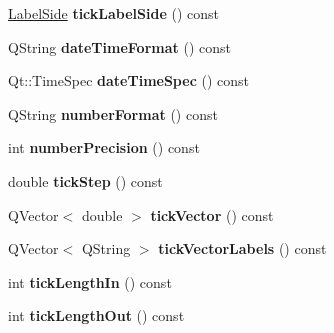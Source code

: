 \begin{DoxyCompactItemize}
\item 
\hyperlink{class_q_c_p_axis_a24b13374b9b8f75f47eed2ea78c37db9}{Label\+Side} {\bfseries tick\+Label\+Side} () const \hypertarget{class_q_c_p_axis_a0a33835705406506b02a445b1ba32357}{}\label{class_q_c_p_axis_a0a33835705406506b02a445b1ba32357}

\item 
Q\+String {\bfseries date\+Time\+Format} () const \hypertarget{class_q_c_p_axis_a132b54ae184a12ed24c9af24f53dc70b}{}\label{class_q_c_p_axis_a132b54ae184a12ed24c9af24f53dc70b}

\item 
Qt\+::\+Time\+Spec {\bfseries date\+Time\+Spec} () const \hypertarget{class_q_c_p_axis_afdd04c56ed29a9d948f840fc76f0d383}{}\label{class_q_c_p_axis_afdd04c56ed29a9d948f840fc76f0d383}

\item 
Q\+String {\bfseries number\+Format} () const \hypertarget{class_q_c_p_axis_ae6729b40845b29ffa5a440aa53cec215}{}\label{class_q_c_p_axis_ae6729b40845b29ffa5a440aa53cec215}

\item 
int {\bfseries number\+Precision} () const \hypertarget{class_q_c_p_axis_a91cb2825060ac79a889296377fe0c7c1}{}\label{class_q_c_p_axis_a91cb2825060ac79a889296377fe0c7c1}

\item 
double {\bfseries tick\+Step} () const \hypertarget{class_q_c_p_axis_a0e6120d24266544441ab691f316a1b03}{}\label{class_q_c_p_axis_a0e6120d24266544441ab691f316a1b03}

\item 
Q\+Vector$<$ double $>$ {\bfseries tick\+Vector} () const \hypertarget{class_q_c_p_axis_a5b00b14f480f926df976cc6c52309e78}{}\label{class_q_c_p_axis_a5b00b14f480f926df976cc6c52309e78}

\item 
Q\+Vector$<$ Q\+String $>$ {\bfseries tick\+Vector\+Labels} () const \hypertarget{class_q_c_p_axis_a64e6fa81f943ad33dcaf3fa606687b93}{}\label{class_q_c_p_axis_a64e6fa81f943ad33dcaf3fa606687b93}

\item 
int {\bfseries tick\+Length\+In} () const \hypertarget{class_q_c_p_axis_a59265d65c5034695ac2578bccbbb0f4a}{}\label{class_q_c_p_axis_a59265d65c5034695ac2578bccbbb0f4a}

\item 
int {\bfseries tick\+Length\+Out} () const \hypertarget{class_q_c_p_axis_ae1b3d7473f50ba8544b2027c1cdc80f2}{}\label{class_q_c_p_axis_ae1b3d7473f50ba8544b2027c1cdc80f2}


\end{DoxyCompactItemize}
